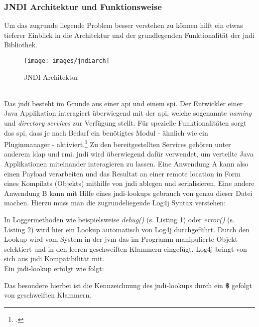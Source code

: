 \subsubsection{JNDI Architektur und Funktionsweise}

Um das zugrunde liegende Problem besser verstehen zu können hilft ein etwas tieferer Einblick in die Architektur
und der grundlegenden Funktionalität der \gls{jndi} Bibliothek.
\begin{figure}[!htb]\label{fig:jndiarch} %
    \begin{center}
        \texttt{[image: images/jndiarch]}
    \end{center}
    \caption{JNDI Architektur}
\end{figure}
\\
Das \gls{jndi} besteht im Grunde aus einer \gls{api} und einem \gls{spi}. Der Entwickler einer Java Applikation interagiert überwiegend mit der \gls{api}, welche sogenannte
\textit{naming} und \textit{directory services} zur Verfügung stellt. Für spezielle Funktionalitäten sorgt das \gls{spi}, dass je nach Bedarf ein benötigtes Modul - ähnlich wie ein Pluginmanager
 - aktiviert.\footcite{JNDIArchitektur} Zu den bereitgestellten Services gehören unter anderem \gls{ldap} und \gls{rmi}. \gls{jndi} wird
überwiegend dafür verwendet, um verteilte Java Applikationen miteinander interagieren zu lassen. Eine Anwendung A kann also einen Payload verarbeiten und
das Resultat an einer remote location in Form eines Kompilats (Objekts) mithilfe von \gls{jndi} ablegen und serialisieren. Eine andere Anwendung B kann mit Hilfe eines \gls{jndi}-lookups gebrauch von genau
dieser Datei machen.
Hierzu muss man die zugrundeliegende Log4j Syntax verstehen:

\bigskip

In Loggermethoden wie beispielsweise \textit{debug()} (s. Listing 1) oder \textit{error()} (s. Listing 2) wird hier ein Lookup automatisch von Log4j durchgeführt. Durch den Lookup wird vom System in der \gls{jvm} das im Programm
manipulierte Objekt selektiert und in den leeren geschweiften Klammern eingefügt. Log4j bringt von sich aus \gls{jndi} Kompatibilität mit.\\

Ein \gls{jndi}-lookup erfolgt wie folgt:

\bigskip

Das besondere hierbei ist die Kennzeichnung des \gls{jndi}-lookups durch ein \textbf{\$} gefolgt von geschweiften Klammern.